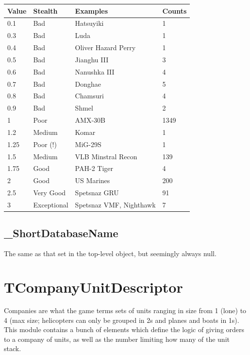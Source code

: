 \documentclass{article}
\begin{document}
\begin{center}
    \begin{tabular}{ | l | l | l | l |}
    \hline
	Value & Stealth & Examples & Counts\\ \hline
	0.1 & Bad & Hatsuyiki & 1\\
	0.3 & Bad & Luda & 1\\
	0.4 & Bad & Oliver Hazard Perry & 1\\
	0.5 & Bad & Jianghu III & 3\\
	0.6 & Bad & Nanushka III & 4\\
	0.7 & Bad & Donghae & 5\\
	0.8 & Bad & Chamsuri & 4\\
	0.9 & Bad & Shmel & 2\\
	1 & Poor & AMX-30B & 1349\\
	1.2 & Medium & Komar & 1\\
	1.25 & Poor (!) & MiG-29S & 1\\
	1.5 & Medium & VLB Minstral Recon & 139\\
	1.75 & Good & PAH-2 Tiger & 4\\
	2 & Good & US Marines & 200\\
	2.5 & Very Good & Spetsnaz GRU & 91\\
	3 & Exceptional & Spetsnaz VMF, Nighthawk & 7\\
    \hline
    \end{tabular}
\end{center}

\subsection{\_ShortDatabaseName}

The same as that set in the top-level object, but seemingly always null.

\section{TCompanyUnitDescriptor}

Companies are what the game terms sets of units ranging in size from 1 (lone) to 4 (max size; helicopters can only be grouped in 2s and planes and boats in 1s). This module contains a bunch of elements which define the logic of giving orders to a company of units, as well as the number limiting how many of the unit stack.
\end{document}
